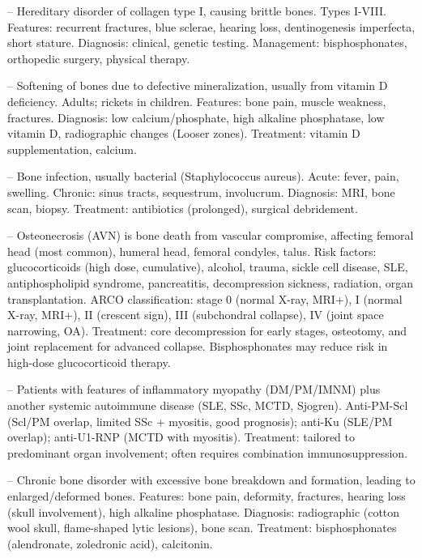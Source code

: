 -- Hereditary disorder of collagen type I, causing brittle bones. Types I-VIII. Features: recurrent fractures, blue sclerae, hearing loss, dentinogenesis imperfecta, short stature. Diagnosis: clinical, genetic testing. Management: bisphosphonates, orthopedic surgery, physical therapy.

-- Softening of bones due to defective mineralization, usually from vitamin D deficiency. Adults; rickets in children. Features: bone pain, muscle weakness, fractures. Diagnosis: low calcium/phosphate, high alkaline phosphatase, low vitamin D, radiographic changes (Looser zones). Treatment: vitamin D supplementation, calcium.

-- Bone infection, usually bacterial (Staphylococcus aureus). Acute: fever, pain, swelling. Chronic: sinus tracts, sequestrum, involucrum. Diagnosis: MRI, bone scan, biopsy. Treatment: antibiotics (prolonged), surgical debridement.

-- Osteonecrosis (AVN) is bone death from vascular compromise, affecting femoral head (most common), humeral head, femoral condyles, talus. Risk factors: glucocorticoids (high dose, cumulative), alcohol, trauma, sickle cell disease, SLE, antiphospholipid syndrome, pancreatitis, decompression sickness, radiation, organ transplantation. ARCO classification: stage 0 (normal X-ray, MRI+), I (normal X-ray, MRI+), II (crescent sign), III (subchondral collapse), IV (joint space narrowing, OA). Treatment: core decompression for early stages, osteotomy, and joint replacement for advanced collapse. Bisphosphonates may reduce risk in high-dose glucocorticoid therapy.

-- Patients with features of inflammatory myopathy (DM/PM/IMNM) plus another systemic autoimmune disease (SLE, SSc, MCTD, Sjogren). Anti-PM-Scl (Scl/PM overlap, limited SSc + myositis, good prognosis); anti-Ku (SLE/PM overlap); anti-U1-RNP (MCTD with myositis). Treatment: tailored to predominant organ involvement; often requires combination immunosuppression.

-- Chronic bone disorder with excessive bone breakdown and formation, leading to enlarged/deformed bones. Features: bone pain, deformity, fractures, hearing loss (skull involvement), high alkaline phosphatase. Diagnosis: radiographic (cotton wool skull, flame-shaped lytic lesions), bone scan. Treatment: bisphosphonates (alendronate, zoledronic acid), calcitonin.


